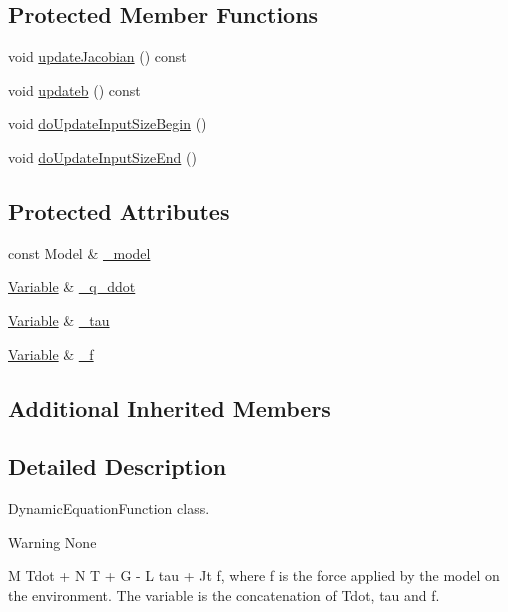 \subsection*{Protected Member Functions}
\begin{DoxyCompactItemize}
\item 
void \hyperlink{classocra_1_1DynamicEquationFunction_a81d71c87d0f52b3d321614c6219022ad}{update\+Jacobian} () const
\item 
void \hyperlink{classocra_1_1DynamicEquationFunction_ae1fe835a481f5f0bde6c8b0fa8ea09b2}{updateb} () const
\item 
void \hyperlink{classocra_1_1DynamicEquationFunction_a6fc52fcd947fa303e55729dbb286b92c}{do\+Update\+Input\+Size\+Begin} ()
\item 
void \hyperlink{classocra_1_1DynamicEquationFunction_a8d20f6ed1e3983d1fddf648729eba955}{do\+Update\+Input\+Size\+End} ()
\end{DoxyCompactItemize}
\subsection*{Protected Attributes}
\begin{DoxyCompactItemize}
\item 
const Model \& \hyperlink{classocra_1_1DynamicEquationFunction_ad0c5d639974a97aa3ed3f0bbe0f8189d}{\+\_\+model}
\item 
\hyperlink{classocra_1_1Variable}{Variable} \& \hyperlink{classocra_1_1DynamicEquationFunction_a8a6dfb64fcca3c42a9e7ad637706a6cc}{\+\_\+q\+\_\+ddot}
\item 
\hyperlink{classocra_1_1Variable}{Variable} \& \hyperlink{classocra_1_1DynamicEquationFunction_a60ba636a9028046969c5491ec7ed2f9e}{\+\_\+tau}
\item 
\hyperlink{classocra_1_1Variable}{Variable} \& \hyperlink{classocra_1_1DynamicEquationFunction_a70499af5c86e68836acb7251b37ab668}{\+\_\+f}
\end{DoxyCompactItemize}
\subsection*{Additional Inherited Members}


\subsection{Detailed Description}
Dynamic\+Equation\+Function class. 

\begin{DoxyWarning}{Warning}
None
\end{DoxyWarning}
M Tdot + N T + G -\/ L tau + Jt f, where f is the force applied by the model on the environment. The variable is the concatenation of Tdot, tau and f. 

